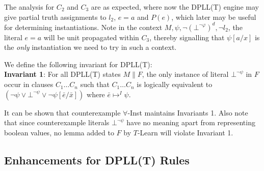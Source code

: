 \documentclass{llncs}
\begin{document}


The analysis for $C_2$ and $C_3$ are as expected, where now the DPLL(T) engine may give partial truth assignments to $l_2$, $e = a$ and $P( e )$, which later may be useful for determining instantiations.
Note in the context $M, \psi, \neg( \bot^{\neg \varphi} )^d, \neg l_2$, the literal $e = a$ will be unit propagated within $C_3$, thereby signalling that $\psi[a/x]$ is the \emph{only} instantiation we need to try in such a context.

We define the following invariant for DPLL(T): \\

{\bf Invariant 1}:
For all DPLL(T) states $M \parallel F$, the only instance of literal $\bot^{\neg \psi}$ in $F$ occur in clauses $C_1 \ldots C_n$ such that $C_1 \ldots C_n$ is logically equivalent to $( \neg \psi \vee \bot^{\neg \psi} \vee \neg \psi[\bar{e}/\bar{x}] )$ where $\bar{e} \mapsto^I \psi$.


It can be shown that counterexample $\forall$-Inst maintains Invariants 1.
Also note that since counterexample literals $\bot^{ \neg \psi }$ have no meaning apart from representing boolean values, no lemma added to $F$ by $T$-Learn will violate Invariant 1.

\subsection{Enhancements for DPLL(T) Rules}
\label{sec:enhance-dpllt}
\end{document}
